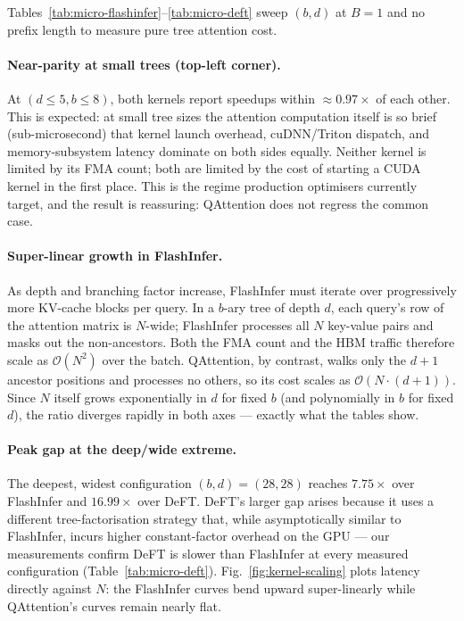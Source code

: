 \documentclass{article}
\newcommand{\method}{QAttention}
\newcommand{\bigO}[1]{\mathcal{O}(#1)}
\newcommand{\numtokens}{N}
\newcommand{\depth}{d}
\newcommand{\branching}{b}
\newcommand{\batchsize}{B}
\begin{document}
Tables~\ref{tab:micro-flashinfer}--\ref{tab:micro-deft} sweep
$(\branching,\depth)$ at $\batchsize{=}1$ and no prefix length
to measure pure tree attention cost.

\paragraph{Near-parity at small trees (top-left corner).}
At $(\depth{\le}5,\branching{\le}8)$, both kernels report
speedups within $\approx\!0.97\times$ of each other.
This is expected: at small tree sizes the attention computation
itself is so brief (sub-microsecond) that kernel launch overhead,
cuDNN/Triton dispatch, and memory-subsystem latency dominate on
both sides equally. Neither kernel is limited by its FMA count;
both are limited by the cost of starting a CUDA kernel in the
first place. This is the regime production optimisers currently
target, and the result is reassuring: \method{} does not
regress the common case.

\paragraph{Super-linear growth in FlashInfer.}
As depth and branching factor increase, FlashInfer must iterate
over progressively more KV-cache blocks per query. In a
$\branching$-ary tree of depth $\depth$, each query's row of
the attention matrix is $\numtokens$-wide; FlashInfer processes
all $\numtokens$ key-value pairs and masks out the non-ancestors.
Both the FMA count and the HBM traffic therefore scale as
$\bigO{\numtokens^2}$ over the batch. \method{}, by contrast,
walks only the $\depth{+}1$ ancestor positions and processes
no others, so its cost scales as $\bigO{\numtokens\!\cdot\!(\depth{+}1)}$.
Since $\numtokens$ itself grows exponentially in $\depth$ for
fixed $\branching$ (and polynomially in $\branching$ for fixed
$\depth$), the ratio diverges rapidly in both axes --- exactly
what the tables show.

\paragraph{Peak gap at the deep/wide extreme.}
The deepest, widest configuration
$(\branching,\depth){=}(28,28)$ reaches $7.75\times$ over FlashInfer
and $16.99\times$ over DeFT. DeFT's larger gap arises because it uses a
different tree-factorisation strategy that, while asymptotically
similar to FlashInfer, incurs higher constant-factor overhead on
the GPU --- our measurements confirm DeFT is slower than
FlashInfer at every measured configuration
(Table~\ref{tab:micro-deft}).
Fig.~\ref{fig:kernel-scaling} plots latency directly against
$\numtokens$: the FlashInfer curves bend upward super-linearly
while \method{}'s curves remain nearly flat.
\end{document}
